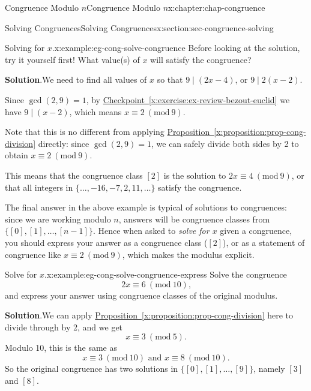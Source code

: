 \documentclass[oneside,10pt,]{book}
\newcommand{\blocktitlefont}{\relax}
\newcommand{\xreffont}{\relax}
\numberwithin{equation}{section}
\newcommand{\Mod}[1]{\ \left(\mathrm{mod}\ #1\right)}
\begin{document}
\begin{chapterptx}{Congruence Modulo \(n\)}{}{Congruence Modulo \(n\)}{}{}{x:chapter:chap-congruence}
\begin{sectionptx}{Solving Congruences}{}{Solving Congruences}{}{}{x:section:sec-congruence-solving}
\begin{example}{Solving for \(x\).}{x:example:eg-cong-solve-congruence}
Before looking at the solution, try it yourself first! What value(s) of \(x\) will satisfy the congruence?%
\par\smallskip%
\noindent\textbf{\blocktitlefont Solution}.\hypertarget{g:solution:id443234}{}\quad{}We need to find all values of \(x\) so that \(9 \mid (2x - 4)\), or \(9 \mid 2(x-2)\).%
\par
Since \(\gcd(2,9) = 1\), by \hyperref[x:exercise:ex-review-bezout-euclid]{Checkpoint~{\xreffont\ref{x:exercise:ex-review-bezout-euclid}}} we have \(9 \mid (x-2)\), which means \(x \equiv 2 \Mod{9}\).%
\par
Note that this is no different from applying \hyperref[x:proposition:prop-cong-division]{Proposition~{\xreffont\ref{x:proposition:prop-cong-division}}} directly: since \(\gcd(2,9) = 1\), we can safely divide both sides by 2 to obtain \(x \equiv 2 \Mod{9}\).%
\par
This means that the congruence class \([2]\) is the solution to \(2x \equiv 4 \Mod{9}\), or that all integers in \(\{\ldots,-16,-7,2,11,\ldots\}\) satisfy the congruence.%
\end{example}
The final answer in the above example is typical of solutions to congruences: since we are working modulo \(n\), answers will be congruence classes from \(\{[0],[1],\ldots,[n-1]\}\). Hence when asked to \emph{solve for \(x\)} given a congruence, you should express your answer as a congruence class (\([2]\)), or as a statement of congruence like \(x \equiv 2 \Mod{9}\), which makes the modulus explicit.%
\begin{example}{Solve for \(x\).}{x:example:eg-cong-solve-congruence-express}%
Solve the congruence%
\begin{equation*}
2x \equiv 6 \Mod{10}\text{,}
\end{equation*}
and express your answer using congruence classes of the original modulus.%
\par\smallskip%
\noindent\textbf{\blocktitlefont Solution}.\hypertarget{g:solution:id443298}{}\quad{}We can apply \hyperref[x:proposition:prop-cong-division]{Proposition~{\xreffont\ref{x:proposition:prop-cong-division}}} here to divide through by 2, and we get%
\begin{equation*}
x \equiv 3 \Mod{5}\text{.}
\end{equation*}
Modulo 10, this is the same as%
\begin{equation*}
x \equiv 3 \Mod{10} \text{ and } x \equiv 8 \Mod{10}\text{.}
\end{equation*}
So the original congruence has two solutions in \(\{[0],[1],\ldots,[9]\}\), namely \([3]\) and \([8]\).%

\end{example}
\end{sectionptx}
\end{chapterptx}
\end{document}

